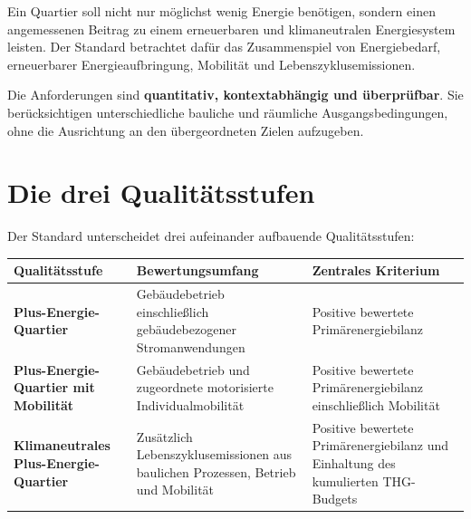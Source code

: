 \documentclass[
  ngerman,
  a4paper,
  DIV=11]{scrreprt}
\newcounter{none} %
\begin{document}
Ein Quartier soll nicht nur möglichst wenig Energie benötigen, sondern
einen angemessenen Beitrag zu einem erneuerbaren und klimaneutralen
Energiesystem leisten. Der Standard betrachtet dafür das Zusammenspiel
von Energiebedarf, erneuerbarer Energieaufbringung, Mobilität und
Lebenszyklusemissionen.

Die Anforderungen sind \textbf{quantitativ, kontextabhängig und
überprüfbar}. Sie berücksichtigen unterschiedliche bauliche und
räumliche Ausgangsbedingungen, ohne die Ausrichtung an den
übergeordneten Zielen aufzugeben.

\section{Die drei Qualitätsstufen}\label{die-drei-qualituxe4tsstufen}

Der Standard unterscheidet drei aufeinander aufbauende Qualitätsstufen:

{\def\LTcaptype{none} %
\begin{longtable}[]{@{}
  >{\raggedright\arraybackslash}p{}
  >{\raggedright\arraybackslash}p{}
  >{\raggedright\arraybackslash}p{}@{}}
\toprule\noalign{}
\begin{minipage}[b]{\linewidth}\raggedright
Qualitätsstufe
\end{minipage} & \begin{minipage}[b]{\linewidth}\raggedright
Bewertungsumfang
\end{minipage} & \begin{minipage}[b]{\linewidth}\raggedright
Zentrales Kriterium
\end{minipage} \\
\midrule\noalign{}
\endhead
\bottomrule\noalign{}
\endlastfoot
\textbf{Plus-Energie-Quartier} & Gebäudebetrieb einschließlich
gebäudebezogener Stromanwendungen & Positive bewertete
Primärenergiebilanz \\
\textbf{Plus-Energie-Quartier mit Mobilität} & Gebäudebetrieb und
zugeordnete motorisierte Individualmobilität & Positive bewertete
Primärenergiebilanz einschließlich Mobilität \\
\textbf{Klimaneutrales Plus-Energie-Quartier} & Zusätzlich
Lebenszyklusemissionen aus baulichen Prozessen, Betrieb und Mobilität &
Positive bewertete Primärenergiebilanz und Einhaltung des kumulierten
THG-Budgets \\
\end{longtable}
}
\end{document}
